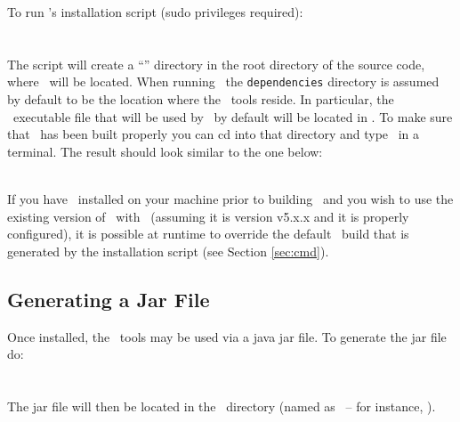 \noindent To run \trail's installation script (sudo privileges required): \\ 


\noindent {} \\
\noindent {} \\


\noindent The script will create a ``'' directory in the root directory of the source code, where \clingo \ will be located. When running \trail \ the \texttt{dependencies} directory is assumed by default to be the location where the \clingo \ tools reside. In particular, the  \ executable file that will be used by \trail \ by default will be located in . To make sure that \clingo \ has been built properly you can cd into that directory and type  \ in a terminal. The result should look similar to the one below: \\

\noindent {}

\noindent {}

\noindent \cmdout{\large \ldots}

\noindent {}\\


\noindent If you have \clingo \ installed on your machine prior to building \trail \ and you wish to use the existing version of \clingo \ with \trail \ (assuming it is version v5.x.x and it is properly configured), it is possible at runtime to override the default \clingo \ build that is generated by the installation script (see Section \ref{sec:cmd}). 

\subsection{Generating a Jar File}
\label{sec:jar}
Once installed, the \trail \ tools may be used via a java jar file. To generate the jar file do: \\

\noindent {} \\
\noindent {} \\
 
\noindent The jar file will then be located in the  \ directory (named as  \ -- for instance, ). \\

